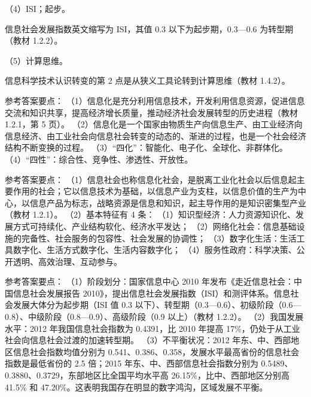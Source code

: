 \documentclass[a4paper,11pt]{article}
\begin{document}
\q （4）ISI；起步。\begin{analysis}信息社会发展指数英文缩写为 ISI，其值 0.3 以下为起步期，0.3—0.6 为转型期（教材 1.2.2）。\end{analysis}

\q （5）计算思维。\begin{analysis}信息科学技术认识转变的第 2 点是从狭义工具论转到计算思维（教材 1.4.2）。\end{analysis}


\q 参考答案要点：
（1）信息化是充分利用信息技术，开发利用信息资源，促进信息交流和知识共享，提高经济增长质量，推动经济社会发展转型的历史进程（教材 1.2.1，第 5 页）。
（2）信息化是一个国家由物质生产向信息生产、由工业经济向信息经济、由工业社会向信息社会转变的动态的、渐进的过程，也是一个社会经济结构不断变换的过程。
（3）“四化”：智能化、电子化、全球化、非群体化。
（4）“四性”：综合性、竞争性、渗透性、开放性。

\q 参考答案要点：
（1）信息社会也称信息化社会，是脱离工业化社会以后信息起主要作用的社会；它以信息技术为基础，以信息产业为支柱，以信息价值的生产为中心，以信息产品为标志，战略资源是信息和知识，起主导作用的是知识密集型产业（教材 1.2.1）。
（2）基本特征有 4 条：
（1）知识型经济：人力资源知识化、发展方式可持续化、产业结构软化、经济水平发达；
（2）网络化社会：信息基础设施的完备性、社会服务的包容性、社会发展的协调性；
（3）数字化生活：生活工具数字化、生活方式数字化、生活内容数字化；
（4）服务性政府：科学决策、公开透明、高效治理、互动参与。

\q 参考答案要点：
（1）阶段划分：国家信息中心 2010 年发布《走近信息社会：中国信息社会发展报告 2010》，提出信息社会发展指数（ISI）和测评体系。信息社会发展大体分为起步期（ISI 值 0.3 以下）、转型期（0.3—0.6）、初级阶段（0.6—0.8）、中级阶段（0.8—0.9）、高级阶段（0.9 以上）（教材 1.2.2）。
（2）我国发展水平：2012 年我国信息社会指数为 0.4391，比 2010 年提高 17\%，仍处于从工业社会向信息社会过渡的加速转型期。
（3）不平衡状况：2012 年东、中、西部地区信息社会指数均值分别为 0.541、0.386、0.358，发展水平最高省份的信息社会指数是最低省份的 2.5 倍；2015 年东、中、西部信息社会指数分别为 0.5489、0.3880、0.3729，东部地区比全国平均水平高 26.15\%，比中、西部地区分别高 41.5\% 和 47.20\%。这表明我国存在明显的数字鸿沟，区域发展不平衡。
\end{document}
